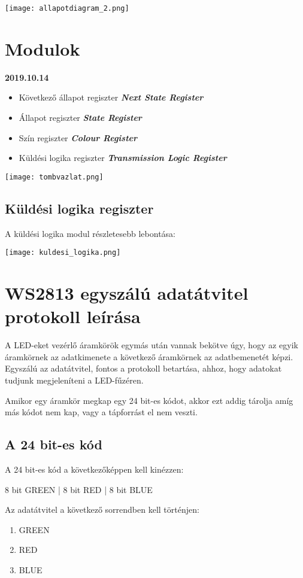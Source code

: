 \documentclass[10pt]{article} %
\begin{document}
\texttt{[image: allapotdiagram\_2.png]}

\section{Modulok}

\textbf{2019.10.14}
\begin{itemize}
\item Következő állapot regiszter \textbf{\textit{Next State Register}}
\item Állapot regiszter \textbf{\textit{State Register}}
\item Szín regiszter \textbf{\textit{Colour Register}}
\item Küldési logika regiszter \textbf{\textit{Transmission Logic Register}}
\end{itemize}

\texttt{[image: tombvazlat.png]}

\subsection{Küldési logika regiszter}

\noindent A küldési logika modul részletesebb lebontása: 

\texttt{[image: kuldesi\_logika.png]}


\section{WS2813 egyszálú adatátvitel protokoll leírása}

\indent A LED-eket vezérlő áramkörök egymás után vannak bekötve úgy, hogy az egyik áramkörnek az adatkimenete a következő áramkörnek az adatbemenetét képzi. Egyszálú az adatátvitel, fontos a protokoll betartása, ahhoz, hogy adatokat tudjunk megjeleníteni a LED-fűzéren.

Amikor egy áramkör megkap egy 24 bit-es kódot, akkor ezt addig tárolja amíg más kódot nem kap, vagy a tápforrást el nem veszti.

\subsection{A 24 bit-es kód}

A 24 bit-es kód a következőképpen kell kinézzen:

8 bit GREEN | 8 bit RED | 8 bit BLUE

Az adatátvitel a következő sorrendben kell történjen: 
\begin{enumerate}
	\item GREEN
	\item RED
	\item BLUE
\end{enumerate}
\end{document}
